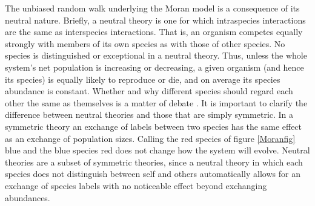 The unbiased random walk underlying the Moran model is a consequence of its neutral nature. %
Briefly, a neutral theory is one for which intraspecies interactions are the same as interspecies interactions. 
That is, an organism competes equally strongly with members of its own species as with those of other species. 
No species is distinguished or exceptional in a neutral theory. 
Thus, unless the whole system's net population is increasing or decreasing, a given organism (and hence its species) is equally likely to reproduce or die, and on average its species abundance is constant. 
Whether and why different species should regard each other the same as themselves is a matter of debate \cite{Hubbell2001,Leibold2006,Leigh2007,Rosindell2011}. %
It is important to clarify the difference between neutral theories and those that are simply symmetric. 
In a symmetric theory an exchange of labels between two species has the same effect as an exchange of population sizes. 
Calling the red species of figure \ref{Moranfig} blue and the blue species red does not change how the system will evolve. 
Neutral theories are a subset of symmetric theories, since a neutral theory in which each species does not distinguish between self and others automatically allows for an exchange of species labels with no noticeable effect beyond exchanging abundances. 


